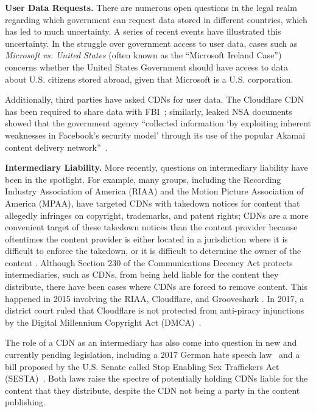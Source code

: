 \textbf{User Data Requests.}
There are numerous open questions in the legal realm regarding which government can request data stored in different countries, which 
has led to much uncertainty.  A series of recent events have illustrated this uncertainty.  In the struggle over government access to 
user data, cases such as {\it Microsoft vs. United States} (often known as the ``Microsoft Ireland Case'') concerns whether the United 
States Government should have access to data about U.S. citizens stored abroad, given that Microsoft is a U.S. corporation.  

Additionally, third parties have asked CDNs for user data.  The Cloudflare CDN has
been required
to share data with FBI~\cite{cloudflare_nsl}; similarly, leaked NSA documents showed
that the government agency ``collected information `by exploiting inherent 
weaknesses in Facebook's security model' through its use of the popular Akamai content
delivery network''~\cite{facebook_surv}.

\textbf{Intermediary Liability.}
More recently, questions on intermediary liability have been in the spotlight.  For example, many groups, including the Recording Industry 
Association of America (RIAA) and the Motion Picture Association of America (MPAA), have targeted CDNs with takedown notices for 
content that allegedly infringes on copyright, trademarks, and patent rights; CDNs are a more convenient target of these takedown notices than 
the content provider because oftentimes the content provider is either located in a jurisdiction where it is difficult to enforce the takedown, 
or it is difficult to determine the owner of the content \cite{medium_copyright,eff_copyright}.
Although Section 230 of the Communications Decency Act protects intermediaries,
such as CDNs, from being held
liable for the content they distribute, there have been cases where CDNs are forced
to remove content.  This happened in 2015 involving the RIAA, Cloudflare, and Grooveshark \cite{techdirt_copyright}. In 2017, a district court ruled that Cloudflare is not protected from anti-piracy injunctions by the Digital Millennium Copyright Act (DMCA)~\cite{stack_copyright}.

The role of a CDN as an intermediary has also come into question in new and currently
pending legislation, including a 2017 German hate speech law~\cite{nytimes_hatespeech} and a bill proposed by the U.S. Senate called Stop Enabling Sex Traffickers Act (SESTA)~\cite{medium_sesta}. Both laws raise the spectre of potentially holding CDNs liable for the content that they distribute, despite the CDN not being a party in the content publishing.

